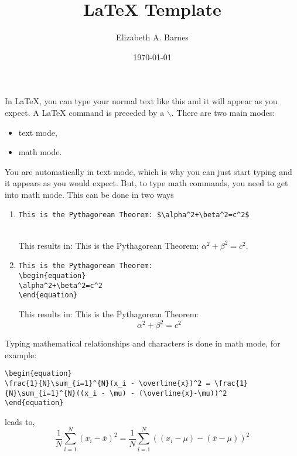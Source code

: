 \documentclass[12pt]{article}
\begin{document}
\title{\Large{{\LaTeX} Template}}
\author{Elizabeth A. Barnes}
\date{\today}
\maketitle

In {\LaTeX}, you can type your normal text like this and it will appear as you expect. A {\LaTeX} command is preceded by a $\backslash$. There are two main modes:
\begin{itemize}
\item text mode,
\item math mode.
\end{itemize}
You are automatically in text mode, which is why you can just start typing and it appears as you would expect. But, to type math commands, you need to get into math mode. This can be done in two ways
\begin{enumerate}
\item \begin{verbatim}This is the Pythagorean Theorem: $\alpha^2+\beta^2=c^2$\end{verbatim} \\
This results in: This is the Pythagorean Theorem: $\alpha^2+\beta^2=c^2$.
\item \begin{verbatim}This is the Pythagorean Theorem: 
\begin{equation} 
\alpha^2+\beta^2=c^2 
\end{equation}
\end{verbatim}
This results in: This is the Pythagorean Theorem: 
\begin{equation} 
\alpha^2+\beta^2=c^2 
\end{equation}
\end{enumerate}

Typing mathematical relationships and characters is done in math mode, for example:
 {\scriptsize \begin{verbatim}
\begin{equation}
\frac{1}{N}\sum_{i=1}^{N}(x_i - \overline{x})^2 = \frac{1}{N}\sum_{i=1}^{N}((x_i - \mu) - (\overline{x}-\mu))^2
\end{equation}
\end{verbatim}
}
leads to, 
\begin{equation}
\frac{1}{N}\sum_{i=1}^{N}(x_i - \overline{x})^2 = \frac{1}{N}\sum_{i=1}^{N}((x_i - \mu) - (\overline{x}-\mu))^2
\end{equation}
\end{document}

